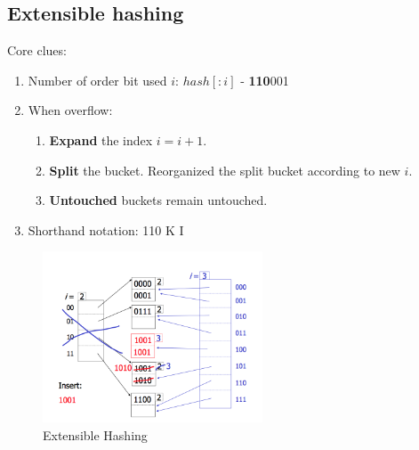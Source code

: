 \documentclass[a4paper]{report}
\begin{document}
\subsection{Extensible hashing}
Core clues:
\begin{enumerate}
\item Number of  order bit used $i$: $hash[:i]$ - \textbf{110}001
\item When overflow:
  \begin{enumerate}
  \item \textbf{Expand} the index $i=i+1$.
  \item \textbf{Split} the bucket. Reorganized the split bucket according to new $i$.
  \item \textbf{Untouched} buckets remain untouched. 
  \end{enumerate}
\item Shorthand notation: 110  K I
\end{enumerate}
\begin{figure}[H]
        \centerline{\includegraphics[height = 2in]{img/extensible_hashing}}
        \caption{Extensible Hashing}
    \label{fig:extensibleHashing}
\end{figure}
\end{document}

